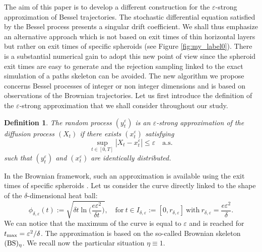 \documentclass[12pt]{article}
\newtheorem{definition}[thm]{Definition}
\numberwithin{equation}{section}
\begin{document}
The aim of this paper is to develop a different construction for the $\varepsilon$-strong approximation
of Bessel trajectories. The stochastic differential equation satisfied by the Bessel process
presents a singular drift coefficient. We shall thus emphasize an alternative approach which
is not based on exit times of thin horizontal layers but rather on exit times of specific
spheroids (see Figure \ref{fig:my_label0}). There is a substantial numerical gain to adopt this new point of
view since the spheroid exit times are easy to generate and the rejection sampling linked to
the exact simulation of a paths skeleton can be avoided. The new algorithm we propose concerns Bessel
processes of integer or non integer dimensions and is based on observations of the Brownian
trajectories.
Let us first introduce the definition of the $\varepsilon$-strong approximation that we shall consider
throughout our study.
\begin{definition}\label{def}
The random process $(y_t^\varepsilon)$ is an $\varepsilon$-strong approximation of the diffusion process $(X_t)$ if there exists $(x^\varepsilon_t)$ satisfying
\begin{equation}
\label{eq:def}
\sup_{t\in[0,T]}|X_t-x^\varepsilon_t|\le \varepsilon\quad\mbox{a.s.}
\end{equation}
such that $(y^\varepsilon_t)$ and $(x^\varepsilon_t)$ are identically distributed.
\end{definition}
In the Brownian framework, such an approximation is available using the exit times
of specific spheroids \cite{deaconu2020strong}. Let us consider the curve directly linked to the shape of the
$\delta$-dimensional heat ball:
\begin{equation}
\label{def:phi}
\phi_{\delta,\varepsilon}(t):=\sqrt{\delta t\ln\Big(\frac{e\varepsilon^2}{\delta t }\Big)}, \quad \mbox{for}\ t\in I_{\delta, \varepsilon}:=[0,r_{\delta,\varepsilon}]\ \mbox{with}\ r_{\delta,\varepsilon}=\frac{e\varepsilon^2}{\delta}.
\end{equation}
We can notice that the maximum of the curve is equal to $\varepsilon$ and is reached for $t_{\rm max}=\varepsilon^2/\delta$. The approximation is based on the so-called Brownian skeleton $({\rm BS})_\eta$. We recall now the particular situation $\eta\equiv 1$.
\end{document}

